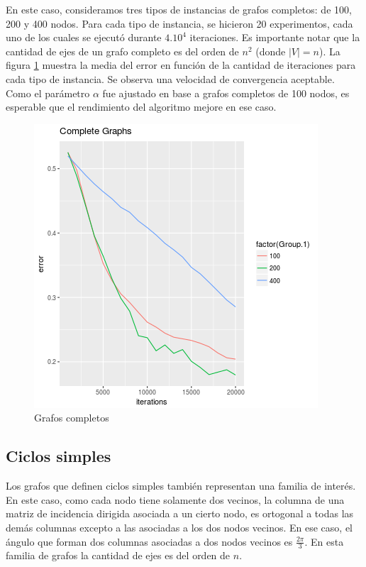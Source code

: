 \documentclass[10pt, a4paper, twocolumn]{article} %
\begin{document}
\smallskip

En este caso, consideramos tres tipos de instancias de grafos 
completos: de 100, 200 y 400 nodos. Para cada tipo de instancia, se 
hicieron 20 experimentos, cada uno de los cuales se ejecutó durante 
$4 . 10^4$ iteraciones. Es importante notar que la cantidad de ejes de 
un grafo completo es del orden de $n^2$ (donde $|V| = n$).  La figura 
\ref{fig:complete} muestra la media del error en función de la cantidad 
de iteraciones para cada tipo de instancia. Se observa una velocidad de 
convergencia aceptable. Como el parámetro $\alpha$ fue ajustado en 
base a grafos completos de 100 nodos, es esperable que el rendimiento 
del algoritmo mejore en ese caso.


\begin{figure}
	\includegraphics[width=\linewidth]{complete_graphs.png} %
	\caption{Grafos completos} %
	\label{fig:complete} %
\end{figure}

\subsection{Ciclos simples}

Los grafos que definen ciclos simples también representan una familia 
de interés. En este caso, como cada nodo tiene solamente dos vecinos, 
la columna de una matriz de incidencia dirigida asociada a un cierto 
nodo, es ortogonal a todas las demás columnas excepto a las asociadas a 
los dos nodos vecinos. En ese caso, el ángulo que forman dos columnas
asociadas a dos nodos vecinos es $\frac{2\pi}{3}$. En esta familia de 
grafos la cantidad de ejes es del orden de $n$.
\end{document}
